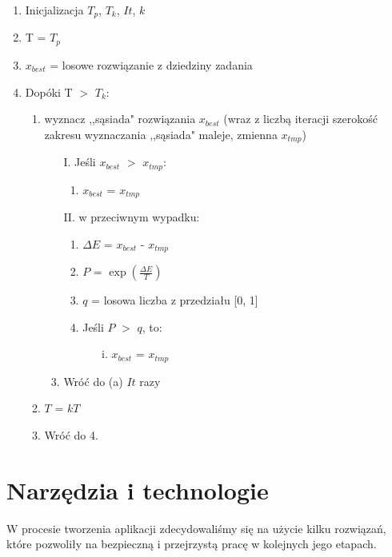 \documentclass[twoside]{projektInzynierskiMS1}
\newcommand{\si}{ś}
\begin{document}
\begin{enumerate}
	\item Inicjalizacja $T_p$, $T_k$, $It$, $k$
	\item T = $T_p$
	\item $x_{best}$ = losowe rozwiązanie z dziedziny zadania
	\item Dopóki T $>$ $T_k$:
	
	\begin{enumerate}
		\item  wyznacz ,,sąsiada" rozwiązania $x_{best}$ (wraz z liczbą iteracji szeroko\si ć zakresu wyznaczania ,,sąsiada" maleje, zmienna $x_{tmp}$)
		\begin{enumerate}
			\item[I.] Je\si li $x_{best}$ $>$ $x_{tmp}$:
			\begin{enumerate}
				\item $x_{best}$ = $x_{tmp}$
			\end{enumerate}
			\item[II.] w przeciwnym wypadku:
			\begin{enumerate}
				\item $\Delta E$ = $x_{best}$ - $x_{tmp}$
				\item $P$ = $\exp\left(\frac{\Delta E}{T}\right)$
				\item $q$ = losowa liczba z przedziału [0, 1]
				\item Je\si li $P$ $>$ $q$, to:
				\begin{itemize}
					\item[i.] $x_{best}$ = $x_{tmp}$
				\end{itemize}
			\end{enumerate}
			\item Wróć do (a) $It$ razy
		\end{enumerate}
		\item $T$ = $k$$T$
		\item Wróć do 4.
	\end{enumerate}	
\end{enumerate}
	



	

\section{Narzędzia i technologie}
W procesie tworzenia aplikacji zdecydowali\si my się na użycie kilku rozwiązań, które pozwoliły na bezpieczną i przejrzystą pracę w kolejnych jego etapach. \\
\end{document}
